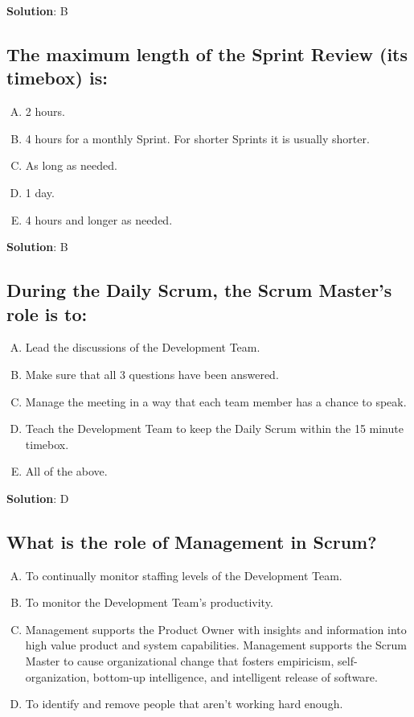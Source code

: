 \textbf{Solution}: B


\subsection{The maximum length of the Sprint Review (its timebox) is:}
\begin{enumerate}[A)]
  \item 2 hours.
  \item 4 hours for a monthly Sprint. For shorter Sprints it is usually shorter.
  \item As long as needed.
  \item 1 day.
  \item 4 hours and longer as needed.
\end{enumerate}


\textbf{Solution}: B


\subsection{During the Daily Scrum, the Scrum Master's role is to:}
\begin{enumerate}[A)]
  \item Lead the discussions of the Development Team.
  \item Make sure that all 3 questions have been answered.
  \item Manage the meeting in a way that each team member has a chance to speak.
  \item Teach the Development Team to keep the Daily Scrum within the 15 minute timebox.
  \item All of the above.
\end{enumerate}


\textbf{Solution}: D


\subsection{What is the role of Management in Scrum?}
\begin{enumerate}[A)]
  \item To continually monitor staffing levels of the Development Team.
  \item To monitor the Development Team's productivity.
  \item Management supports the Product Owner with insights and information into high value product and system capabilities. Management supports the Scrum Master to cause organizational change that fosters empiricism, self-organization, bottom-up intelligence, and intelligent release of software.
  \item To identify and remove people that aren't working hard enough.
\end{enumerate}


